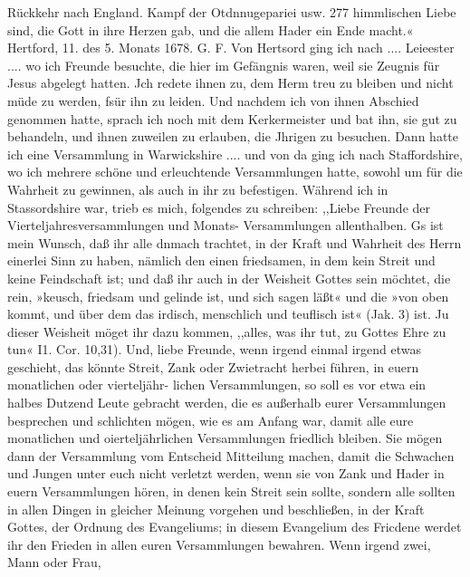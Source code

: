 Rückkehr nach England. Kampf der Otdnnugepariei usw. 277
himmlischen Liebe sind, die Gott in ihre Herzen gab, und die
allem Hader ein Ende macht.«
Hertford, 11. des 5. Monats 1678. G. F.
Von Hertsord ging ich nach .... Leieester .... wo ich
Freunde besuchte, die hier im Gefängnis waren, weil sie Zeugnis
für Jesus abgelegt hatten. Jch redete ihnen zu, dem Herm treu
zu bleiben und nicht müde zu werden, fsür ihn zu leiden. Und
nachdem ich von ihnen Abschied genommen hatte, sprach ich noch
mit dem Kerkermeister und bat ihn, sie gut zu behandeln, und
ihnen zuweilen zu erlauben, die Jhrigen zu besuchen. Dann hatte
ich eine Versammlung in Warwickshire .... und von da ging
ich nach Staffordshire, wo ich mehrere schöne und erleuchtende
Versammlungen hatte, sowohl um für die Wahrheit zu gewinnen,
als auch in ihr zu befestigen. Während ich in Stassordshire war,
trieb es mich, folgendes zu schreiben:
,,Liebe Freunde der Vierteljahresversammlungen und Monats-
Versammlungen allenthalben. Gs ist mein Wunsch, daß ihr alle
dnmach trachtet, in der Kraft und Wahrheit des Herrn einerlei
Sinn zu haben, nämlich den einen friedsamen, in dem kein Streit
und keine Feindschaft ist; und daß ihr auch in der Weisheit
Gottes sein möchtet, die rein, »keusch, friedsam und gelinde ist,
und sich sagen läßt« und die »von oben kommt, und über dem
das irdisch, menschlich und teuflisch ist« (Jak. 3) ist. Ju dieser
Weisheit möget ihr dazu kommen, ,,alles, was ihr tut, zu Gottes
Ehre zu tun« I1. Cor. 10,31). Und, liebe Freunde, wenn irgend
einmal irgend etwas geschieht, das könnte Streit, Zank oder
Zwietracht herbei führen, in euern monatlichen oder vierteljähr-
lichen Versammlungen, so soll es vor etwa ein halbes Dutzend
Leute gebracht werden, die es außerhalb eurer Versammlungen
besprechen und schlichten mögen, wie es am Anfang war, damit
alle eure monatlichen und oierteljährlichen Versammlungen friedlich
bleiben. Sie mögen dann der Versammlung vom Entscheid Mitteilung
machen, damit die Schwachen und Jungen unter euch nicht verletzt
werden, wenn sie von Zank und Hader in euern Versammlungen
hören, in denen kein Streit sein sollte, sondern alle sollten in
allen Dingen in gleicher Meinung vorgehen und beschließen, in
der Kraft Gottes, der Ordnung des Evangeliums; in diesem
Evangelium des Fricdene werdet ihr den Frieden in allen euren
Versammlungen bewahren. Wenn irgend zwei, Mann oder Frau,


